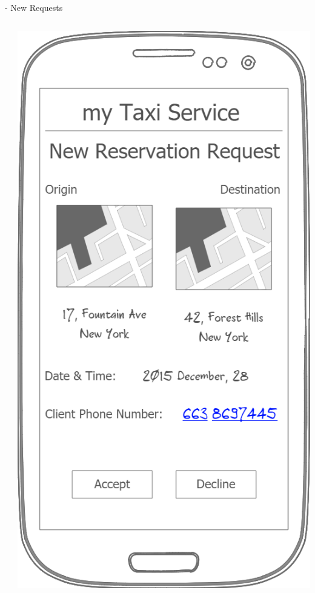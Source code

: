 \documentclass[9pt]{beamer}
\makeatletter
\newcommand*{\currentname}{\@currentlabelname}
\makeatother
\begin{document}
\begin{frame}{\currentname{} - New Requests}
\begin{columns}[c]
\begin{column}{.5\textwidth}
		\centering
  \end{column}
  \begin{column}{.5\textwidth}
    \includegraphics[height=.8\textheight]{Mockup-TaxiDriversReservationRequest}
		\centering
  \end{column}
\end{columns}
\end{frame}
\end{document}
